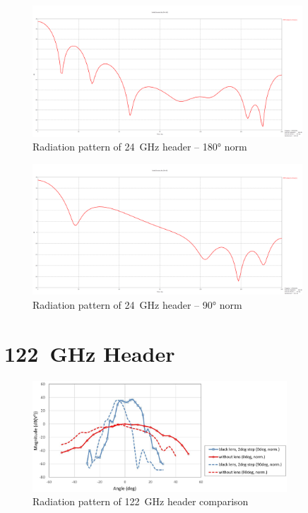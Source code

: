 \begin{figure}[h!]
  \centering
  \includegraphics[width=0.9\textwidth]{../img/farfield180.png}
  \caption[Radiation pattern of 24~GHz header -- 180° norm]{Radiation pattern of 24~GHz header -- 180° norm}
  \label{fig:farfield180}
\end{figure}

\begin{figure}[h!]
  \centering
  \includegraphics[width=0.9\textwidth]{../img/farfield90.png}
  \caption[Radiation pattern of 24~GHz header -- 90° norm]{Radiation pattern of 24~GHz header -- 90° norm}
  \label{fig:farfield90}
\end{figure}


\section{122~GHz Header}


\begin{figure}[h!]
  \centering
  \includegraphics[width=0.85\textwidth]{../img/sidar122rad.jpg}
	\caption[Radiation pattern of 122~GHz header comparison \cite{sidarTRX122col}]{Radiation pattern of 122~GHz header comparison \cite{sidarTRX122col}}
  \label{fig:sidar122rad}
\end{figure}

